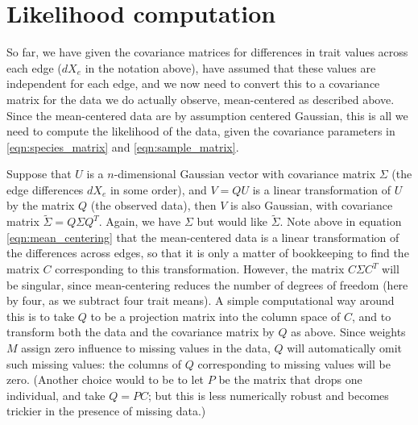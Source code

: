 \documentclass{article}
\begin{document}
\section{Likelihood computation}

So far, we have given the covariance matrices for differences in trait values across each edge ($dX_e$ in the notation above),
have assumed that these values are independent for each edge,
and we now need to convert this to a covariance matrix for the data we do actually observe,
mean-centered as described above.
Since the mean-centered data are by assumption centered Gaussian, 
this is all we need to compute the likelihood of the data, given the covariance parameters in \eqref{eqn:species_matrix} and \eqref{eqn:sample_matrix}.

Suppose that $U$ is a $n$-dimensional Gaussian vector with covariance matrix $\Sigma$ (the edge differences $dX_e$ in some order),
and $V = Q U$ is a linear transformation of $U$ by the matrix $Q$ (the observed data),
then $V$ is also Gaussian, with covariance matrix $\widetilde \Sigma = Q \Sigma Q^T$.
Again, we have $\Sigma$ but would like $\widetilde \Sigma$.
Note above in equation \eqref{eqn:mean_centering} that the mean-centered data is a linear transformation of the differences across edges,
so that it is only a matter of bookkeeping to find the matrix $C$ corresponding to this transformation.
However, the matrix $C \Sigma C^T$ will be singular, since mean-centering reduces the number of degrees of freedom (here by four, as we subtract four trait means).
A simple computational way around this is to take $Q$ to be a projection matrix into the column space of $C$,
and to transform both the data and the covariance matrix by $Q$ as above.
Since weights $M$ assign zero influence to missing values in the data,
$Q$ will automatically omit such missing values: the columns of $Q$ corresponding to missing values will be zero.
(Another choice would to be to let $P$ be the matrix that drops one individual, and take $Q = PC$; 
but this is less numerically robust
and becomes trickier in the presence of missing data.)
\end{document}
